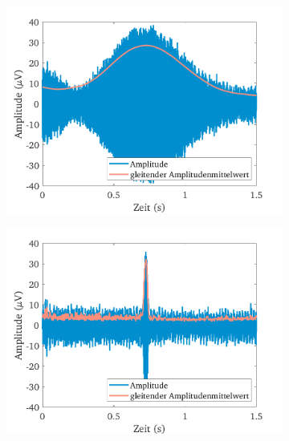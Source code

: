 \documentclass[../main.tex]{subfiles}
\begin{document}
    \begin{figure}[H]
            \begin{subfigure}[c]{0.5\textwidth}
                \includegraphics[width=\linewidth]{Bilddateien/9/optimal/Fig_1}
                \label{fig:Hahn_FID_opt}
            \end{subfigure}
            \begin{subfigure}[c]{0.5\textwidth}
                \includegraphics[width=\linewidth]{Bilddateien/9/worse_negative/Fig_1}
                \label{fig:Hahn_FID_neg}
            \end{subfigure}
            \begin{subfigure}[c]{0.5\textwidth}

\end{subfigure}
\end{figure}
\end{document}
